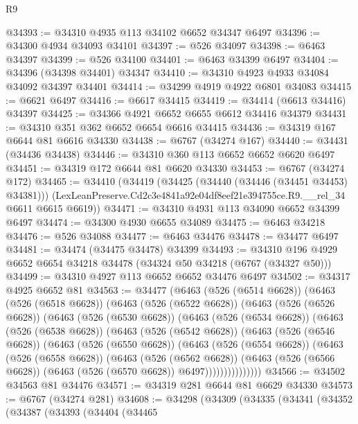 \begin{lexlean}{R9}
\begin{coremodule}
@34393 := @34310 @4935 @113 @34102 @6652 @34347 @6497
@34396 := @34300 @4934 @34093 @34101
@34397 := @526 @34097
@34398 := @6463 @34397
@34399 := @526 @34100
@34401 := @6463 @34399 @6497
@34404 := @34396 (@34398 @34401) @34347
@34410 := @34310 @4923 @4933 @34084 @34092 @34397 @34401
@34414 := @34299 @4919 @4922 @6801 @34083
@34415 := @6621 @6497
@34416 := @6617 @34415
@34419 := @34414 (@6613 @34416) @34397
@34425 := @34366 @4921 @6652 @6655 @6612 @34416 @34379
@34431 := @34310 @351 @362 @6652 @6654 @6616 @34415
@34436 := @34319 @167 @6644 @81 @6616 @34330
@34438 := @6767 (@34274 @167)
@34440 := @34431 (@34436 @34438)
@34446 := @34310 @360 @113 @6652 @6652 @6620 @6497
@34451 := @34319 @172 @6644 @81 @6620 @34330
@34453 := @6767 (@34274 @172)
@34465 := @34410
    (@34419
      (@34425 (@34440 (@34446 (@34451 @34453) @34381)))
      (LexLeanPreserve.Cd2c3e4841a92e04df8eef21e394755ce.R9.__rel_34 @6611 @6615 @6619))
@34471 := @34310 @4931 @113 @34090 @6652 @34399 @6497
@34474 := @34300 @4930 @6655 @34089
@34475 := @6463 @34218
@34476 := @526 @34088
@34477 := @6463 @34476
@34478 := @34477 @6497
@34481 := @34474 (@34475 @34478) @34399
@34493 := @34310 @196 @4929 @6652 @6654 @34218 @34478 (@34324 @50 @34218 (@6767 (@34327 @50)))
@34499 := @34310 @4927 @113 @6652 @6652 @34476 @6497
@34502 := @34317 @4925 @6652 @81
@34563 := @34477
    (@6463
      (@526 (@6514 @6628))
      (@6463
        (@526 (@6518 @6628))
        (@6463
          (@526 (@6522 @6628))
          (@6463
            (@526 (@6526 @6628))
            (@6463
              (@526 (@6530 @6628))
              (@6463
                (@526 (@6534 @6628))
                (@6463
                  (@526 (@6538 @6628))
                  (@6463
                    (@526 (@6542 @6628))
                    (@6463
                      (@526 (@6546 @6628))
                      (@6463
                        (@526 (@6550 @6628))
                        (@6463
                          (@526 (@6554 @6628))
                          (@6463
                            (@526 (@6558 @6628))
                            (@6463
                              (@526 (@6562 @6628))
                              (@6463
                                (@526 (@6566 @6628))
                                (@6463 (@526 (@6570 @6628)) @6497)))))))))))))))
@34566 := @34502 @34563 @81 @34476
@34571 := @34319 @281 @6644 @81 @6629 @34330
@34573 := @6767 (@34274 @281)
@34608 := @34298
    (@34309
      (@34335
        (@34341
          (@34352
            (@34387
              (@34393
                (@34404
                  (@34465

\end{coremodule}
\end{lexlean}
